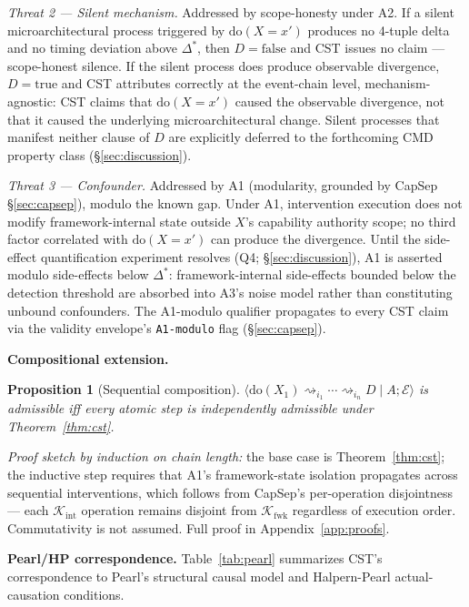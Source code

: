 \documentclass[conference]{IEEEtran}
\newtheorem{proposition}{Proposition}
\newcommand{\Kint}{\mathcal{K}_\text{int}}
\newcommand{\Kfwk}{\mathcal{K}_\text{fwk}}
\newcommand{\Dstar}{\Delta^{*}}
\newcommand{\dox}[1]{\text{do}(X{=}#1)}
\begin{document}
\emph{Threat 2 --- Silent mechanism.} Addressed by scope-honesty
under A2. If a silent microarchitectural process triggered by
$\dox{x'}$ produces no 4-tuple delta and no timing deviation above
$\Dstar$, then $D = \text{false}$ and CST issues no claim ---
scope-honest silence. If the silent process does produce observable
divergence, $D = \text{true}$ and CST attributes correctly at the
event-chain level, mechanism-agnostic: CST claims that $\dox{x'}$
caused the observable divergence, not that it caused the underlying
microarchitectural change. Silent processes that manifest neither
clause of $D$ are explicitly deferred to the forthcoming CMD
property class (\S\ref{sec:discussion}).

\emph{Threat 3 --- Confounder.} Addressed by A1 (modularity,
grounded by CapSep \S\ref{sec:capsep}), modulo the known gap. Under
A1, intervention execution does not modify framework-internal state
outside $X$'s capability authority scope; no third factor correlated
with $\dox{x'}$ can produce the divergence. Until the side-effect
quantification experiment resolves (Q4; \S\ref{sec:discussion}), A1
is asserted modulo side-effects below $\Dstar$: framework-internal
side-effects bounded below the detection threshold are absorbed into
A3's noise model rather than constituting unbound confounders. The
A1-modulo qualifier propagates to every CST claim via the validity
envelope's \texttt{A1-modulo} flag (\S\ref{sec:capsep}).

\textbf{Compositional extension.}
\begin{proposition}[Sequential composition]
$\langle \text{do}(X_1) \rightsquigarrow_{i_1} \cdots
\rightsquigarrow_{i_n} D \mid A; \mathcal{E}\rangle$ is admissible
iff every atomic step is independently admissible under
Theorem~\ref{thm:cst}.
\end{proposition}

\emph{Proof sketch by induction on chain length:} the base case is
Theorem~\ref{thm:cst}; the inductive step requires that A1's
framework-state isolation propagates across sequential interventions,
which follows from CapSep's per-operation disjointness --- each
$\Kint$ operation remains disjoint from $\Kfwk$ regardless of
execution order. Commutativity is not assumed. Full proof in
Appendix~\ref{app:proofs}.

\textbf{Pearl/HP correspondence.}
Table~\ref{tab:pearl} summarizes CST's correspondence to Pearl's
structural causal model and Halpern-Pearl actual-causation
conditions.
\end{document}
